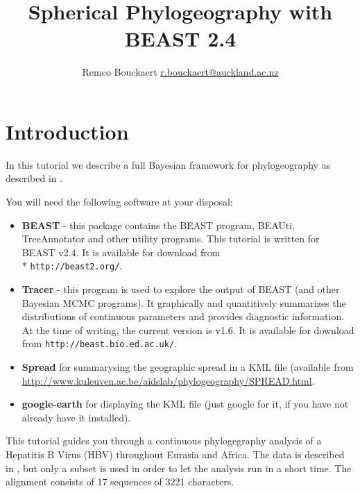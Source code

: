 \documentclass{article}
\newcommand{\BEASTVersion}{2.4}
\newcommand{\TracerVersion}{1.6}
\newcommand{\FigTreeVersion}{1.4.2}
\begin{document}
    \title{Spherical Phylogeography with BEAST \BEASTVersion}
\author{Remco Bouckaert \url{r.bouckaert@auckland.ac.nz}}
\maketitle

\section{Introduction}


In this tutorial we describe a full Bayesian framework for phylogeography as described in  \cite{sphericalgeo}.
 
You will need the following software at your disposal:

\begin{itemize}

\item {\bf BEAST} - this package contains the BEAST program, BEAUti, TreeAnnotator and other utility programs. This tutorial is written for BEAST v{\BEASTVersion}. It is available for download from \\* \texttt{http://beast2.org/}.
\item {\bf Tracer} - this program is used to explore the output of BEAST (and other Bayesian MCMC programs). It graphically and
quantitively summarizes the distributions of continuous parameters and provides diagnostic information. At the time of
writing, the current version is v{\TracerVersion}. It is available for download from \texttt{http://beast.bio.ed.ac.uk/}.
\item {\bf Spread} for summarysing the geographic spread in a KML file (available from \url{http://www.kuleuven.ac.be/aidslab/phylogeography/SPREAD.html}.
\item {\bf google-earth} for displaying the KML file (just google for it, if you have not already have it installed).
\end{itemize}


This tutorial guides you through a continuous phylogegraphy analysis of a Hepatitis B Virus (HBV) throughout Eurasia and Africa. The data is described in \cite{sphericalgeo}, but only a subset is used in order to let the analysis run in a short time. The alignment consists of 17 sequences of  3221 characters.
\end{document}
